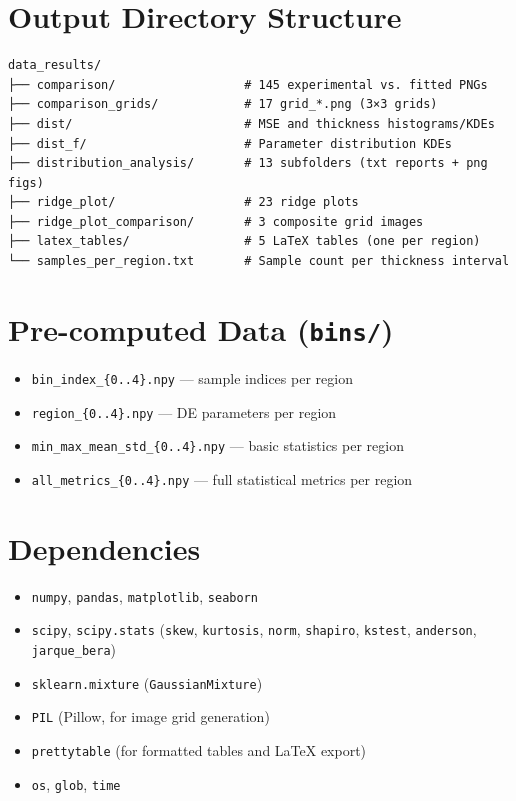 \documentclass[11pt,a4paper]{article}
\begin{document}
\section{Output Directory Structure}

\begin{verbatim}
data_results/
├── comparison/                  # 145 experimental vs. fitted PNGs
├── comparison_grids/            # 17 grid_*.png (3×3 grids)
├── dist/                        # MSE and thickness histograms/KDEs
├── dist_f/                      # Parameter distribution KDEs
├── distribution_analysis/       # 13 subfolders (txt reports + png figs)
├── ridge_plot/                  # 23 ridge plots
├── ridge_plot_comparison/       # 3 composite grid images
├── latex_tables/                # 5 LaTeX tables (one per region)
└── samples_per_region.txt       # Sample count per thickness interval
\end{verbatim}

\section{Pre-computed Data ({\tt bins/})}
\begin{itemize}
    \item {\tt bin\_index\_\{0..4\}.npy} --- sample indices per region
    \item {\tt region\_\{0..4\}.npy} --- DE parameters per region
    \item {\tt min\_max\_mean\_std\_\{0..4\}.npy} --- basic statistics per region
    \item {\tt all\_metrics\_\{0..4\}.npy} --- full statistical metrics per region
\end{itemize}

\section{Dependencies}
\begin{itemize}
    \item {\tt numpy}, {\tt pandas}, {\tt matplotlib}, {\tt seaborn}
    \item {\tt scipy}, {\tt scipy.stats} ({\tt skew}, {\tt kurtosis}, {\tt norm}, {\tt shapiro}, {\tt kstest}, {\tt anderson}, {\tt jarque\_bera})
    \item {\tt sklearn.mixture} ({\tt GaussianMixture})
    \item {\tt PIL} (Pillow, for image grid generation)
    \item {\tt prettytable} (for formatted tables and LaTeX export)
    \item {\tt os}, {\tt glob}, {\tt time}
\end{itemize}
\end{document}
